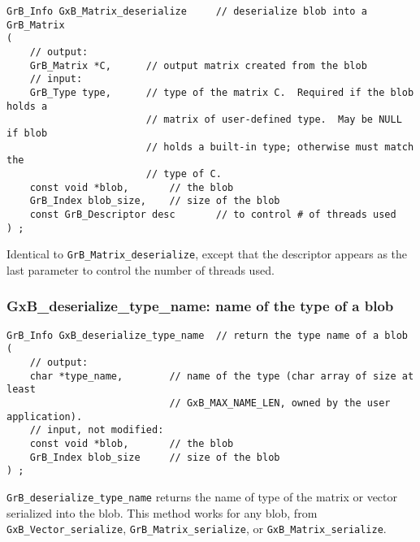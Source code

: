 \documentclass[12pt]{article}
\begin{document}
{\begin{mdframed}[userdefinedwidth=6in]
{\footnotesize
\begin{verbatim}
GrB_Info GxB_Matrix_deserialize     // deserialize blob into a GrB_Matrix
(
    // output:
    GrB_Matrix *C,      // output matrix created from the blob
    // input:
    GrB_Type type,      // type of the matrix C.  Required if the blob holds a
                        // matrix of user-defined type.  May be NULL if blob
                        // holds a built-in type; otherwise must match the
                        // type of C.
    const void *blob,       // the blob
    GrB_Index blob_size,    // size of the blob
    const GrB_Descriptor desc       // to control # of threads used
) ;
\end{verbatim}
} \end{mdframed}

Identical to \verb'GrB_Matrix_deserialize', except that the descriptor
appears as the last parameter to control the number of threads used.

\newpage
\subsubsection{{\sf GxB\_deserialize\_type\_name:} name of the type of a blob}
\label{deserialize_type_name}

\begin{mdframed}[userdefinedwidth=6in]
{\footnotesize
\begin{verbatim}
GrB_Info GxB_deserialize_type_name  // return the type name of a blob
(
    // output:
    char *type_name,        // name of the type (char array of size at least
                            // GxB_MAX_NAME_LEN, owned by the user application).
    // input, not modified:
    const void *blob,       // the blob
    GrB_Index blob_size     // size of the blob
) ;
\end{verbatim}
} \end{mdframed}

\verb'GrB_deserialize_type_name' returns the name of type of the matrix or
vector serialized into the blob.  This method works for any blob, from
\verb'GxB_Vector_serialize',
\verb'GrB_Matrix_serialize', or \verb'GxB_Matrix_serialize'.

\newpage
}
\end{document}
